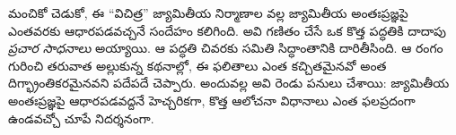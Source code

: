 \documentclass[../../../include/open-logic-section]{subfiles}
\begin{document}
మంచికో చెడుకో, ఈ ``విచిత్ర'' జ్యామితీయ నిర్మాణాల వల్ల జ్యామితీయ అంతఃప్రజ్ఞపై ఎంతవరకు ఆధారపడవచ్చనే సందేహం కలిగింది. అవి గణితం చేసే ఒక కొత్త పద్ధతికి దాదాపు \emph{ప్రచార సాధనాలు} అయ్యాయి. ఆ పద్ధతి చివరకు సమితి సిద్ధాంతానికి దారితీసింది. ఆ రంగం గురించి తరువాత అల్లుకున్న కథనాల్లో, ఈ ఫలితాలు ఎంత కచ్చితమైనవో అంత దిగ్భ్రాంతికరమైనవని పదేపదే చెప్పారు. అందువల్ల అవి రెండు పనులు చేశాయి: జ్యామితీయ అంతఃప్రజ్ఞపై ఆధారపడవద్దనే హెచ్చరికగా, కొత్త ఆలోచనా విధానాలు ఎంత ఫలప్రదంగా ఉండవచ్చో చూపే నిదర్శనంగా.
\end{document}
